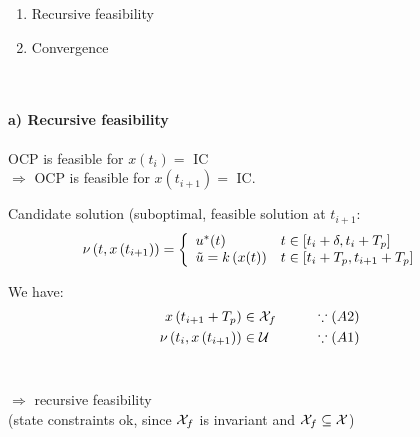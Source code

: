 \begin{enumerate}
    \renewcommand{\theenumi}{\alph{enumi}}
    \renewcommand{\labelenumi}{\theenumi )}
    \item Recursive feasibility
    \item Convergence
\end{enumerate}~

\paragraph{a) Recursive feasibility}
OCP is feasible for $x(t_i) = $ IC\\
$\Rightarrow$ OCP is feasible for  $x(t_{i+1}) = $ IC.

\begin{figure}[H]
    \centering
\end{figure}

Candidate solution (suboptimal, feasible solution at $t_{i+1}$:
\begin{align*}
    \nu \paren{ t, x \paren{ t_{i+1} } } &= \left\lbrace
        \begin{array}{l>{t \in }l}
            u^*(t)                         & \squareb{ t_i + \delta, t_i + T_p }\\
            \tilde{u} = k \paren{ x(t) }   & \squareb{ t_i + T_p, t_{i+1} + T_p }
        \end{array} \right.
\end{align*}

We have:
\begin{align*}
    x \paren{ t_{i+1} + T_p } &\in \setX{f} \qquad &\because (A2)\\
    \nu \paren{ t_i, x \paren{ t_{i+1} } } &\in \setU{} &\because (A1)
\end{align*}~

$\Rightarrow$ recursive feasibility \\
(state constraints ok, since $\setX{f}$ is invariant and $\setX{f} \subseteq \setX{}$)

